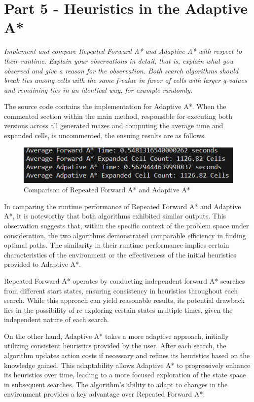 \graphicspath{{Images/}}

\section{Part 5 - Heuristics in the Adaptive A* }

\textit{Implement and compare Repeated Forward A* and Adaptive A*
with respect to their runtime. Explain your observations in detail, that is, explain what you observed and give a reason for
the observation. Both search algorithms should break ties among cells with the same f-value in favor of cells with larger
g-values and remaining ties in an identical way, for example randomly.}

The source code contains the implementation for Adaptive A*. When the commented section within the main method, responsible for executing both versions across all generated mazes and computing the average time and expanded cells, is uncommented, the ensuing results are as follows.

\begin{figure}[h]
    \centering
    \includegraphics[width=.85\linewidth]{imgs/Results of Forward A vs Adaptive A.png}
    \caption{Comparison of Repeated Forward A* and Adaptive A*}
    \label{fig:my_label}
\end{figure}


In comparing the runtime performance of Repeated Forward A* and Adaptive A*, it is noteworthy that both algorithms exhibited similar outputs. This observation suggests that, within the specific context of the problem space under consideration, the two algorithms demonstrated comparable efficiency in finding optimal paths. The similarity in their runtime performance implies certain characteristics of the environment or the effectiveness of the initial heuristics provided to Adaptive A*.

Repeated Forward A* operates by conducting independent forward A* searches from different start states, ensuring consistency in heuristics throughout each search. While this approach can yield reasonable results, its potential drawback lies in the possibility of re-exploring certain states multiple times, given the independent nature of each search.

On the other hand, Adaptive A* takes a more adaptive approach, initially utilizing consistent heuristics provided by the user. After each search, the algorithm updates action costs if necessary and refines its heuristics based on the knowledge gained. This adaptability allows Adaptive A* to progressively enhance its heuristics over time, leading to a more focused exploration of the state space in subsequent searches. The algorithm's ability to adapt to changes in the environment provides a key advantage over Repeated Forward A*.

